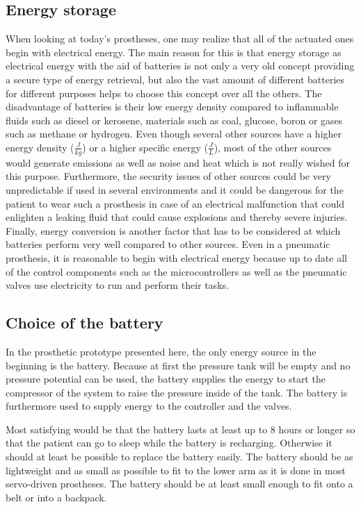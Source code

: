 \documentclass[main]{subfiles}
\begin{document}
\subsection{Energy storage}

When looking at today's prostheses, one may realize that all of the actuated ones begin with electrical energy. The main reason for this is that energy storage as electrical energy with the aid of batteries is not only a very old concept providing a secure type of energy retrieval, but also the vast amount of different batteries for different purposes helps to choose this concept over all the others. The disadvantage of batteries is their low energy density compared to inflammable fluids \cite{energydensity} such as diesel or kerosene, materials such as coal, glucose, boron or gases such as methane or hydrogen. Even though several other sources have a higher energy density ($\frac{J}{kg}$) or a higher specific energy ($\frac{J}{L}$), most of the other sources would generate emissions as well as noise and heat which is not really wished for this purpose. Furthermore, the security issues of other sources could be very unpredictable if used in several environments and it could be dangerous for the patient to wear such a prosthesis in case of an electrical malfunction that could enlighten a leaking fluid that could cause explosions and thereby severe injuries. Finally, energy conversion is another factor that has to be considered at which batteries perform very well compared to other sources.  Even in a pneumatic prosthesis, it is reasonable to begin with electrical energy because up to date all of the control components such as the microcontrollers as well as the pneumatic valves use electricity to run and perform their tasks.


\subsection{Choice of the battery}
In the prosthetic prototype presented here, the only energy source in the beginning is the battery. Because at first the pressure tank will be empty and no pressure potential can be used, the battery supplies the energy to start the compressor of the system to raise the pressure inside of the tank. The battery is furthermore used to supply energy to the controller and the valves.

Most satisfying would be that the battery lasts at least up to 8 hours or longer so that the patient can go to sleep while the battery is recharging. Otherwise it should at least be possible to replace the battery easily. The battery should be as lightweight and as small as possible to fit to the lower arm as it is done in most servo-driven prostheses. The battery should be at least small enough to fit onto a belt or into a backpack.
\end{document}

